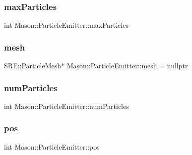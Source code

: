 \subsubsection{\texorpdfstring{max\+Particles}{maxParticles}}
{\footnotesize\ttfamily int Mason\+::\+Particle\+Emitter\+::max\+Particles\hspace{0.3cm}{\ttfamily [protected]}}

\hypertarget{class_mason_1_1_particle_emitter_ab144b5872ad3b63652f8a079069f4cd0}{}\label{class_mason_1_1_particle_emitter_ab144b5872ad3b63652f8a079069f4cd0} 
\subsubsection{\texorpdfstring{mesh}{mesh}}
{\footnotesize\ttfamily S\+R\+E\+::\+Particle\+Mesh$\ast$ Mason\+::\+Particle\+Emitter\+::mesh = nullptr\hspace{0.3cm}{\ttfamily [protected]}}

\hypertarget{class_mason_1_1_particle_emitter_a2df785f58db33ede9255ba835e955e11}{}\label{class_mason_1_1_particle_emitter_a2df785f58db33ede9255ba835e955e11} 
\subsubsection{\texorpdfstring{num\+Particles}{numParticles}}
{\footnotesize\ttfamily int Mason\+::\+Particle\+Emitter\+::num\+Particles\hspace{0.3cm}{\ttfamily [protected]}}

\hypertarget{class_mason_1_1_particle_emitter_a2204ca394c10b6b3a5c5bd11c34d2251}{}\label{class_mason_1_1_particle_emitter_a2204ca394c10b6b3a5c5bd11c34d2251} 
\subsubsection{\texorpdfstring{pos}{pos}}
{\footnotesize\ttfamily int Mason\+::\+Particle\+Emitter\+::pos\hspace{0.3cm}{\ttfamily [protected]}}

